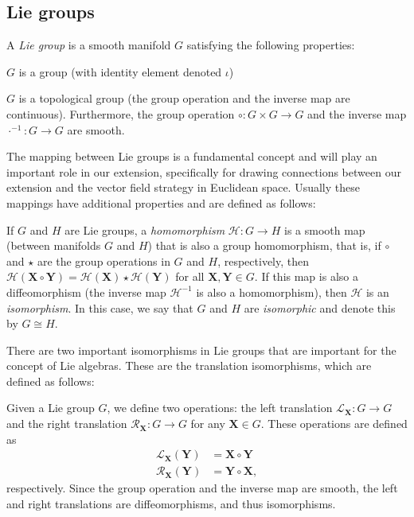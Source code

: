 \subsection{Lie groups}
\begin{definition}
    A \emph{Lie group} is a smooth manifold $G$ satisfying the following properties:
    \begin{property}
        \item $G$ is a group (with identity element denoted $\iota$)
        \item $G$ is a topological group (the group operation and the inverse map are continuous). Furthermore, the group operation $\circ: G\times G\to G$ and the inverse map $\cdot^{-1}: G\to G$ are smooth.
    \end{property}
\end{definition}

The mapping between Lie groups is a fundamental concept and will play an important role in our extension, specifically for drawing connections between our extension and the vector field strategy in Euclidean space. Usually these mappings have additional properties and are defined as follows:
\begin{definition}
    If $G$ and $H$ are Lie groups, a \emph{homomorphism} $\mathcal{H}: G\to H$ is a smooth map (between manifolds $G$ and $H$) that is also a group homomorphism, that is, if $\circ$ and $\star$ are the group operations in $G$ and $H$, respectively, then $\mathcal{H}(\mathbf{X}\circ\mathbf{Y}) = \mathcal{H}(\mathbf{X})\star\mathcal{H}(\mathbf{Y})$ for all $\mathbf{X},\mathbf{Y}\in G$. If this map is also a diffeomorphism (the inverse map $\mathcal{H}^{-1}$ is also a homomorphism), then $\mathcal{H}$ is an \emph{isomorphism}. In this case, we say that $G$ and $H$ are \emph{isomorphic} and denote this by $G\cong H$.
\end{definition}

There are two important isomorphisms in Lie groups that are important for the concept of Lie algebras. These are the translation isomorphisms, which are defined as follows:
\begin{definition}
    Given a Lie group $G$, we define two operations: the left translation $\mathcal{L}_{\mathbf{X}}: G\to G$ and the right translation $\mathcal{R}_{\mathbf{X}}: G\to G$ for any $\mathbf{X}\in G$. These operations are defined as 
    \begin{align}
        \mathcal{L}_{\mathbf{X}}(\mathbf{Y}) &= \mathbf{X}\circ\mathbf{Y}\\
        \mathcal{R}_{\mathbf{X}}(\mathbf{Y}) &= \mathbf{Y}\circ\mathbf{X},
    \end{align}
    respectively. Since the group operation and the inverse map are smooth, the left and right translations are diffeomorphisms, and thus isomorphisms.
\end{definition}

